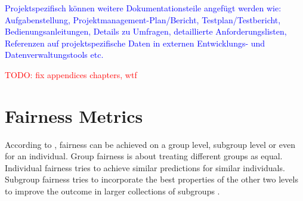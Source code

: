 \documentclass[12pt, a4paper, oneside]{book}   	%
\renewcommand{\todo}[1]{\textcolor{red}{TODO: #1}}
\newcommand{\baaCriteria}[1]{\textcolor{blue}{#1}}
\begin{document}
		
		\newpage
		\appendix
		\begin{appendices}
			\baaCriteria{Projektspezifisch können weitere Dokumentationsteile angefügt werden wie: Aufgabenstellung, Projektmanagement-Plan/Bericht, Testplan/Testbericht, Bedienungsanleitungen, Details zu Umfragen, detaillierte Anforderungslisten, Referenzen auf projektspezifische Daten in externen Entwicklungs- und Datenverwaltungstools etc.}
			
			\todo{fix appendices chapters, wtf}
		
	
			
			
				
			
			\chapter{Fairness Metrics}\label{app:fairnessMetrics}
			 According to \textcite{Mehrabi_2021}, fairness can be achieved on a group level, subgroup level or even for an individual. Group fairness is about treating different groups as equal. Individual fairness tries to achieve similar predictions for similar individuals. Subgroup fairness tries to incorporate the best properties of the other two levels to improve the outcome in larger collections of subgroups \autocite{Mehrabi_2021}. 
			 

\end{appendices}
\end{document}
